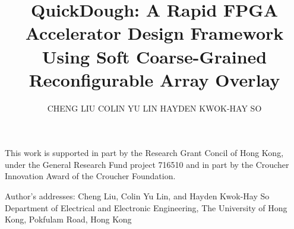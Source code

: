 \documentclass[acmtrets]{acmsmall}
\begin{document}

\title{QuickDough: A Rapid FPGA Accelerator Design Framework Using Soft Coarse-Grained Reconfigurable Array Overlay}
\author{CHENG LIU
COLIN YU LIN
HAYDEN KWOK-HAY SO
}

\begin{abstract}
    
\end{abstract}



\begin{bottomstuff}
This work is supported in part by the Research Grant Concil of Hong
Kong, under the General Research Fund project 716510 and in part by
the Croucher Innovation Award of the Croucher Foundation.

Author's addresses: Cheng Liu, Colin Yu Lin, and Hayden Kwok-Hay So
Department of Electrical and Electronic Engineering, The University of
Hong Kong, Pokfulam Road, Hong Kong

\end{bottomstuff}

\maketitle










{\small}
\end{document}
